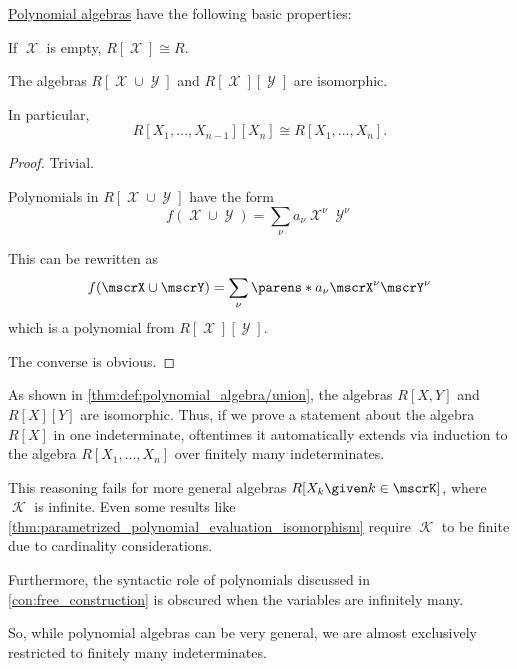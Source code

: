 \begin{proposition}\label{thm:def:polynomial_algebra}
  \hyperref[def:polynomial_algebra]{Polynomial algebras} have the following basic properties:
  \begin{thmenum}
     If \( \mscrX \) is empty, \( R[\mscrX] \cong R \).

     The algebras \( R[\mscrX \cup \mscrY] \) and \( R[\mscrX][\mscrY] \) are isomorphic.

    In particular,
    \begin{equation*}
      R[X_1, \ldots, X_{n-1}][X_n] \cong R[X_1, \ldots, X_n].
    \end{equation*}
  \end{thmenum}
\end{proposition}
\begin{proof}
   Trivial.

   Polynomials in \( R[\mscrX \cup \mscrY] \) have the form
  \begin{equation*}
    f(\mscrX \cup \mscrY) = \sum_\nu a_\nu \mscrX^\nu \mscrY^\nu
  \end{equation*}

  This can be rewritten as
  \begin{equation*}
    f(\mscrX \cup \mscrY) = \sum_\nu \parens*{ a_\nu \mscrX^\nu } \mscrY^\nu
  \end{equation*}
  which is a polynomial from \( R[\mscrX][\mscrY] \).

  The converse is obvious.
\end{proof}

\begin{remark}\label{rem:polynomials_over_infinitely_many_indeterminates}
  As shown in \cref{thm:def:polynomial_algebra/union}, the algebras \( R[X, Y] \) and \( R[X][Y] \) are isomorphic. Thus, if we prove a statement about the algebra \( R[X] \) in one indeterminate, oftentimes it automatically extends via induction to the algebra \( R[X_1, \ldots, X_n] \) over finitely many indeterminates.

  This reasoning fails for more general algebras \( R[X_k \given k \in \mscrK] \), where \( \mscrK \) is infinite. Even some results like \cref{thm:parametrized_polynomial_evaluation_isomorphism} require \( \mscrK \) to be finite due to cardinality considerations.

  Furthermore, the syntactic role of polynomials discussed in \cref{con:free_construction} is obscured when the variables are infinitely many.

  So, while polynomial algebras can be very general, we are almost exclusively restricted to finitely many indeterminates.
\end{remark}

